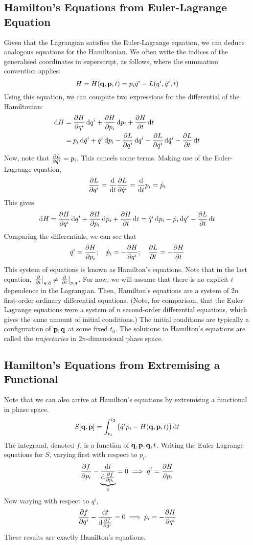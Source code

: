 \subsection{Hamilton's Equations from Euler-Lagrange Equation}
Given that the Lagrangian satisfies the Euler-Lagrange equation, we can deduce analogous equations for the Hamiltonian.
We often write the indices of the generalised coordinates in superscript, as follows, where the summation convention applies:
\[
	H = H(\vb q, \vb p, t) = p_i \dot q^i - L(q^i, \dot q^i, t)
\]
Using this equation, we can compute two expressions for the differential of the Hamiltonian:
\begin{align*}
	\dd{H} & = \pdv{H}{q^i} \dd{q^i} + \pdv{H}{p_i} \dd{p_i} + \pdv{H}{t} \dd{t}                                                  \\
	       & = p_i \dd{\dot{q}^i} + \dot{q}^i \dd{p_i} - \pdv{L}{q^i}\dd{q^i} - \pdv{L}{\dot q^i}\dd{\dot q^i} - \pdv{L}{t}\dd{t}
\end{align*}
Now, note that \( \pdv{L}{\dot q^i} = p_i \).
This cancels some terms.
Making use of the Euler-Lagrange equation,
\[
	\pdv{L}{q^i} = \dv{t} \pdv{L}{\dot q^i} = \dv{t} p_i = \dot{p}_i
\]
This gives
\[
	\dd{H} = \pdv{H}{q^i} \dd{q^i} + \pdv{H}{p_i} \dd{p_i} + \pdv{H}{t} \dd{t} = \dot{q}^i \dd{p_i} - \dot{p}_i\dd{q^i} - \pdv{L}{t}\dd{t}
\]
Comparing the differentials, we can see that
\[
	\dot{q}^i = \pdv{H}{p_i};\quad \dot{p}_i = -\pdv{H}{q^i};\quad \pdv{L}{t} = -\pdv{H}{t}
\]
This system of equations is known as Hamilton's equations.
Note that in the last equation, \( \eval{\pdv{t}}_{q,\dot q} \neq \eval{\pdv{t}}_{p,q} \).
For now, we will assume that there is no explicit \( t \) dependence in the Lagrangian.
Then, Hamilton's equations are a system of \( 2n \) first-order ordinary differential equations.
(Note, for comparison, that the Euler-Lagrange equations were a system of \( n \) second-order differential equations, which gives the same amount of initial conditions.)
The initial conditions are typically a configuration of \( \vb p, \vb q \) at some fixed \( t_0 \).
The solutions to Hamilton's equations are called the \textit{trajectories} in \( 2n \)-dimensional phase space.

\subsection{Hamilton's Equations from Extremising a Functional}
Note that we can also arrive at Hamilton's equations by extremising a functional in phase space.
\[
	S[\vb q, \vb p] = \int_{t_1}^{t_2} \qty( \dot q^i p_i - H(\vb q, \vb p, t)) \dd{t}
\]
The integrand, denoted \( f \), is a function of \( \vb q, \vb p, \dot{\vb q}, t \).
Writing the Euler-Lagrange equations for \( S \), varying first with respect to \( p_i \),
\[
	\pdv{f}{p_i} - \underbrace{\dv{t}{\pdv{f}{\dot p_i}}}_0 = 0 \implies \dot q^i = \pdv{H}{p_i}
\]
Now varying with respect to \( q^i \),
\[
	\pdv{f}{q^i} - \dv{t}{\pdv{f}{\dot q^i}} = 0 \implies \dot p_i = -\pdv{H}{q^i}
\]
These results are exactly Hamilton's equations.
